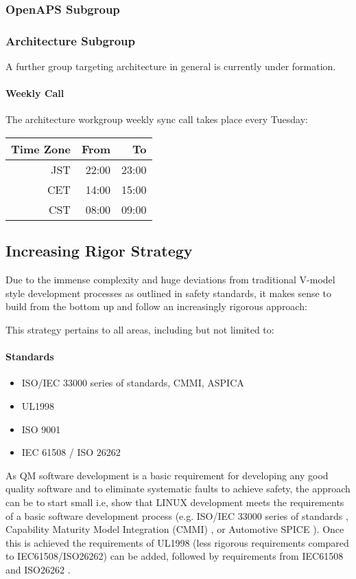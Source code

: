 \documentclass[12pt]{ElisaPaper}
\begin{document}
\subsubsection{OpenAPS Subgroup}
\label{sssec:OpenAPS subgroup}
\subsubsection{Architecture Subgroup}
A further group targeting architecture in general is currently under formation.
\paragraph{Weekly Call}
The architecture workgroup weekly sync call takes place every Tuesday:

\begin{center}
\begin{tabular}{rrr}
	\toprule
	Time Zone & From & To\\
	\midrule
	JST & 22:00 & 23:00 \\
	CET	& 14:00 & 15:00 \\
	CST & 08:00 & 09:00 \\
	\bottomrule 
\end{tabular}
\end{center}

\subsection{Increasing Rigor Strategy}
Due to the immense complexity and huge deviations from traditional V-model style development processes as outlined in safety standards, it makes sense to build from the bottom up and follow an increasingly rigorous approach:

This strategy pertains to all areas, including but not limited to:
\paragraph{Standards}
\begin{itemize}
	\item ISO/IEC 33000 series of standards, CMMI, ASPICA \cite{ISO3300x:2015,CMMI,ASPICE}
	\item UL1998 \cite{UL1998}
	\item ISO 9001 \cite{ISO9001:2015}
	\item IEC 61508 / ISO 26262 \cite{IEC61508:2010,ISO26262:2018}
\end{itemize}
As QM software development is a basic requirement for developing any good quality software and to eliminate systematic faults to achieve safety, the approach can be to start small i.e, show that LINUX development meets the requirements of a basic software development process (e.g. ISO/IEC 33000 series of standards \cite{ISO3300x:2015}, Capability Maturity Model Integration (CMMI) \cite{CMMI}, or Automotive SPICE \cite{ASPICE}).
Once this is achieved the requirements of UL1998 \cite{UL1998} (less rigorous requirements compared to IEC61508/ISO26262) can be added, followed by requirements from IEC61508 and ISO26262 \cite{IEC61508:2010,ISO26262:2018}.
\end{document}
